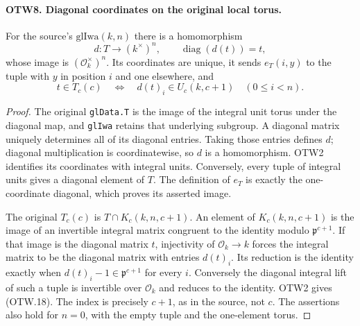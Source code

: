 \paragraph{OTW8. Diagonal coordinates on the original local torus.}
\label{claim:OTW8}
For the source's $\mathrm{glIwa}(k,n)$ there is a homomorphism
\[
       d:T\longrightarrow(k^\times)^n,
       \qquad \operatorname{diag}(d(t))=t,             \tag{OTW.17}
\]
whose image is $(\mathcal O_k^\times)^n$.  Its coordinates are
unique, it sends $e_T(i,y)$ to the tuple with $y$ in position $i$
and one elsewhere, and
\[
 t\in T_c(c)\quad\Longleftrightarrow\quad
                d(t)_i\in U_c(k,c+1)\quad(0\leq i<n).
                \tag{OTW.18}
\]
\begin{proof}
The original \texttt{glData.T} is the image of the integral unit
torus under the diagonal map, and \texttt{glIwa} retains that
underlying subgroup.  A diagonal matrix uniquely determines all
of its diagonal entries.  Taking those entries defines $d$;
diagonal multiplication is coordinatewise, so $d$ is a homomorphism.
OTW2 identifies its coordinates with integral units.  Conversely,
every tuple of integral units gives a diagonal element of $T$.
The definition of $e_T$ is exactly the one-coordinate diagonal,
which proves its asserted image.

The original $T_c(c)$ is $T\cap K_c(k,n,c+1)$.  An element of
$K_c(k,n,c+1)$ is the image of an invertible integral matrix
congruent to the identity modulo $\mathfrak p^{c+1}$.
If that image is the diagonal matrix $t$, injectivity of
$\mathcal O_k\to k$ forces the integral matrix to be the diagonal
matrix with entries $d(t)_i$.  Its reduction is the identity
exactly when $d(t)_i-1\in\mathfrak p^{c+1}$ for every $i$.
Conversely the diagonal integral lift of such a tuple is invertible
over $\mathcal O_k$ and reduces to the identity.  OTW2 gives
(OTW.18).  The index is precisely $c+1$, as in the source, not $c$.
The assertions also hold for $n=0$, with the empty tuple and the
one-element torus.
\end{proof}


